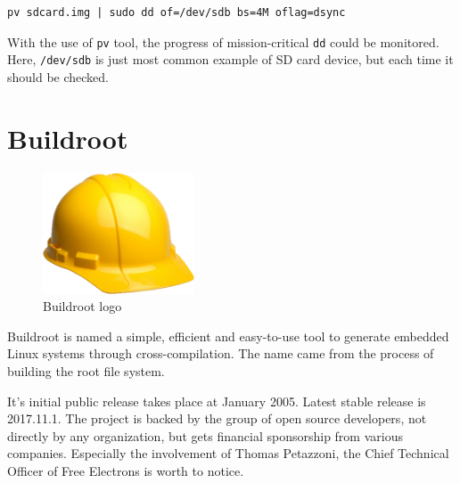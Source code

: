 \documentclass[printmode]{mgr}
\begin{document}
\begin{lstlisting}
pv sdcard.img | sudo dd of=/dev/sdb bs=4M oflag=dsync
\end{lstlisting}

With the use of \verb|pv| tool, the progress of mission-critical \verb|dd| could be monitored. Here, \verb|/dev/sdb| is just most common example of SD card device, but each time it should be checked.












\section{Buildroot}


\begin{figure}[htbp]
  \centering
    \includegraphics[width=0.4\textwidth]{buildroot-logo.png}
    \caption{Buildroot logo}
  \label{fig:buildroot-logo}
\end{figure}

Buildroot is named a simple, efficient and easy-to-use tool to generate embedded Linux systems through cross-compilation. The name came from the process of building the root file system.

It's initial public release takes place at January 2005. Latest stable release is 2017.11.1. The project is backed by the group of open source developers, not directly by any organization, but gets financial sponsorship from various companies. Especially the involvement of Thomas Petazzoni, the Chief Technical Officer of Free Electrons is worth to notice.\cite{web:buildroot-tpetazzoni}
\end{document}
